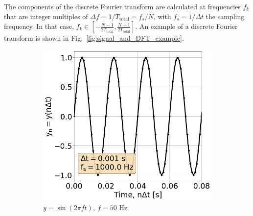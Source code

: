
The components of the discrete Fourier transform are calculated at frequencies $f_k$ that are integer multiples of $\Delta f = 1/T_\mathrm{total} = f_s/N$, with $f_s = 1/\Delta t$ the sampling frequency. In that case, $f_k \in \left[-\frac{N-1}{2T_\mathrm{total}},\frac{N-1}{2T_\mathrm{total}} \right]$. An example of a discrete Fourier transform is shown in Fig.~\ref{fig:signal_and_DFT_example}.
\begin{figure}[!ht]
    \centering
    \begin{subfigure}[t]{0.45\textwidth}
        \centering
        \includegraphics[width=1\textwidth]{./images/app_B/simple_signal_1freq_example.png}
        \caption{$y=\sin(2 \pi f t),\ f=50$ Hz}
        \label{fig:signal_and_DFT_example_a}
    \end{subfigure}
    \hfill
    \begin{subfigure}[t]{0.45\textwidth}
        \centering

\end{subfigure}
\end{figure}
